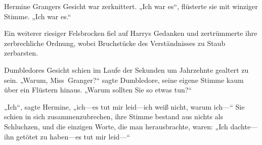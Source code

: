 Hermine Grangers Gesicht war zerknittert.
„Ich war es“, flüsterte sie mit winziger Stimme.
„Ich war es.“

Ein weiterer riesiger Felsbrocken fiel auf Harrys Gedanken und zertrümmerte ihre zerbrechliche Ordnung, wobei Bruchstücke des Verständnisses zu Staub zerbarsten.

Dumbledores Gesicht schien im Laufe der Sekunden um Jahrzehnte gealtert zu sein.
„Warum, Miss~Granger?“ sagte Dumbledore, seine eigene Stimme kaum über ein Flüstern hinaus.
„Warum sollten Sie so etwas tun?“

„Ich“, sagte Hermine, „ich—es tut mir leid—ich weiß nicht, warum ich—“ Sie schien in sich zusammenzubrechen, ihre Stimme bestand aus nichts als Schluchzen, und die einzigen Worte, die man herausbrachte, waren:
„Ich dachte—ihn getötet zu haben—es tut mir leid—“

